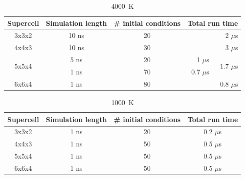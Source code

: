 \begin{table}[h]

\centering
\caption[CONTENTS1]{4000~K}%

\begin{tabular}{cccrr}
Supercell                        & Simulation length & \# initial conditions & \multicolumn{2}{c}{Total run time}           \\ \hline
3x3x2                             & 10 ns                     & 20                             & \multicolumn{2}{r}{2 $\mu$s}   \\ \hline
4x4x3                             & 10 ns                     & 30                             & \multicolumn{2}{r}{3 $\mu$s}               \\ \hline
\multirow{2}{*}{5x5x4} & 5 ns                       & 20                             & 1 $\mu$s     & \multirow{2}{*}{1.7 $\mu$s} \\
                                       & 1 ns                       & 70                              & 0.7 $\mu$s &                               \\ \hline
6x6x4                            & 1 ns                       & 80                              & \multicolumn{2}{r}{0.8 $\mu$s}            
\end{tabular}

\label{tab:gk_fse_times_4K}
\end{table}




\begin{table}[h]

\centering
\caption[CONTENTS2]{1000~K}%

\begin{tabular}{cccc}
Supercell                        & Simulation length & \# initial conditions    & Total run time           \\ \hline
3x3x2                             & 1 ns                        & 20                                & 0.2 $\mu$s               \\ \hline
4x4x3                             & 1 ns                        & 50                                & 0.5 $\mu$s               \\ \hline
5x5x4                             & 1 ns                        & 50                                & 0.5 $\mu$s               \\ \hline
6x6x4                             & 1 ns                        & 50                                & 0.5 $\mu$s            
\end{tabular}

\label{tab:gk_fse_times_1K}

\end{table}


